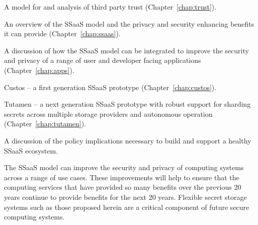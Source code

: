 \begin{packed_item}
\item A model for and analysis of third party trust
  (Chapter~\ref{chap:trust}).
\item An overview of the SSaaS model and the privacy and security
  enhancing benefits it can provide (Chapter~\ref{chap:ssaas}).
\item A discussion of how the SSaaS model can be integrated to improve
  the security and privacy of a range of user and developer facing
  applications (Chapter~\ref{chap:apps}).
\item Custos -- a first generation SSaaS prototype
  (Chapter~\ref{chap:custos}).
\item Tutamen -- a next generation SSaaS prototype with robust support
  for sharding secrets across multiple storage providers and
  autonomous operation (Chapter~\ref{chap:tutamen}).
\item A discussion of the policy implications necessary to build and
  support a healthy SSaaS ecosystem.
\end{packed_item}

The SSaaS model can improve the security and privacy of computing
systems across a range of use cases. These improvements will help to
ensure that the computing services that have provided so many benefits
over the previous 20 years continue to provide benefits for the next
20 years. Flexible secret storage systems such as those proposed
herein are a critical component of future secure computing systems.

